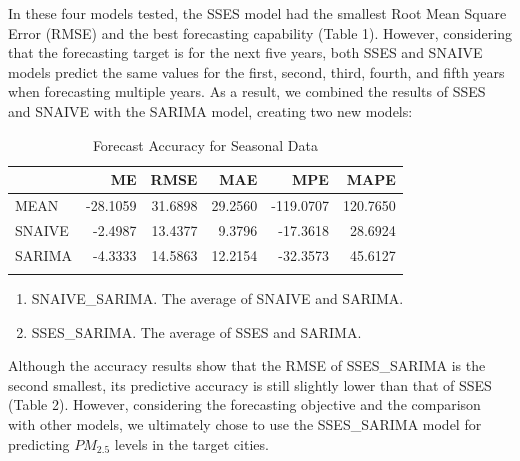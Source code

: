 \documentclass[
  12pt,
]{article}
\providecommand{\tightlist}{%
  \setlength{\itemsep}{0pt}\setlength{\parskip}{0pt}}
\begin{document}
In these four models tested, the SSES model had the smallest Root Mean
Square Error (RMSE) and the best forecasting capability (Table 1).
However, considering that the forecasting target is for the next five
years, both SSES and SNAIVE models predict the same values for the
first, second, third, fourth, and fifth years when forecasting multiple
years. As a result, we combined the results of SSES and SNAIVE with the
SARIMA model, creating two new models:

\begin{table}

\caption{\label{tab:accuacy_table1}Forecast Accuracy for Seasonal Data}
\centering
\begin{tabular}[t]{l|r|r|r|r|r}
\hline
  & ME & RMSE & MAE & MPE & MAPE\\
\hline
MEAN & -28.1059 & 31.6898 & 29.2560 & -119.0707 & 120.7650\\
\hline
SNAIVE & -2.4987 & 13.4377 & 9.3796 & -17.3618 & 28.6924\\
\hline
SARIMA & -4.3333 & 14.5863 & 12.2154 & -32.3573 & 45.6127\\
\hline
\cellcolor{gray!6}{SSES} & \cellcolor{gray!6}{4.8008} & \cellcolor{gray!6}{12.3008} & \cellcolor{gray!6}{7.7936} & \cellcolor{gray!6}{5.2446} & \cellcolor{gray!6}{19.6416}\\
\hline
\end{tabular}
\end{table}

\begin{enumerate}
\def\labelenumi{\arabic{enumi}.}
\setcounter{enumi}{4}
\tightlist
\item
  SNAIVE\_SARIMA. The average of SNAIVE and SARIMA.
\item
  SSES\_SARIMA. The average of SSES and SARIMA.
\end{enumerate}

Although the accuracy results show that the RMSE of SSES\_SARIMA is the
second smallest, its predictive accuracy is still slightly lower than
that of SSES (Table 2). However, considering the forecasting objective
and the comparison with other models, we ultimately chose to use the
SSES\_SARIMA model for predicting \(PM_{2.5}\) levels in the target
cities.
\end{document}

